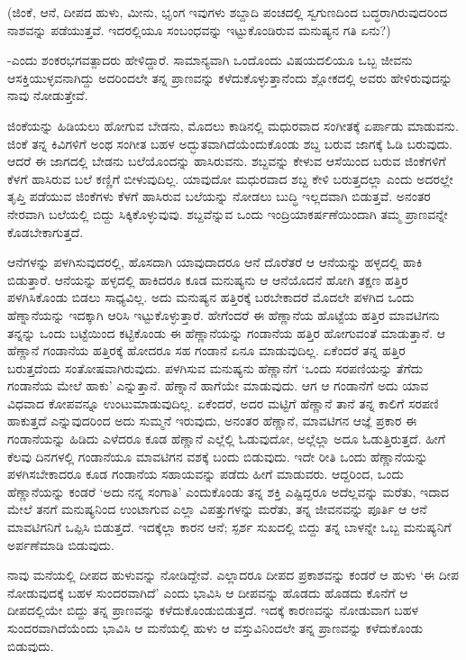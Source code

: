 (ಜಿಂಕೆ, ಆನೆ, ದೀಪದ ಹುಳು, ಮೀನು, ಭೃಂಗ ಇವುಗಳು ಶಬ್ದಾದಿ ಪಂಚದಲ್ಲಿ ಸ್ವಗುಣದಿಂದ ಬದ್ಧರಾಗಿರುವುದರಿಂದ ನಾಶವನ್ನು ಪಡೆಯುತ್ತವೆ. ಇದರಲ್ಲಿಯೂ ಸಂಬಂಧವನ್ನು ಇಟ್ಟುಕೊಂಡಿರುವ ಮನುಷ್ಯನ ಗತಿ ಏನು?)

-ಎಂದು ಶಂಕರಭಗವತ್ಪಾದರು ಹೇಳಿದ್ದಾರೆ. ಸಾಮಾನ್ಯವಾಗಿ ಒಂದೊಂದು ವಿಷಯದಲಿಯೂ ಒಬ್ಬ ಜೀವನು ಆಸಕ್ತಿಯುಳ್ಳವನಾಗಿದ್ದು ಅದರಿಂದಲೇ ತನ್ನ ಪ್ರಾಣವನ್ನು ಕಳೆದುಕೊಳ್ಳುತ್ತಾನೆಂದು ಶ್ಲೋಕದಲ್ಲಿ ಅವರು ಹೇಳಿರುವುದನ್ನು ನಾವು ನೋಡುತ್ತೇವೆ.

ಜಿಂಕೆಯನ್ನು ಹಿಡಿಯಲು ಹೋಗುವ ಬೇಡನು, ಮೊದಲು ಕಾಡಿನಲ್ಲಿ ಮಧುರವಾದ ಸಂಗೀತಕ್ಕೆ ಏರ್ಪಾಡು ಮಾಡುವನು. ಜಿಂಕೆ ತನ್ನ ಕಿವಿಗಳಿಗೆ ಅಂಥ ಸಂಗೀತ ಬಹಳ ಅದ್ಭುತವಾಗಿದೆಯೆಂದುಕೊಂಡು ಶಬ್ದ ಬರುವ ಜಾಗಕ್ಕೆ ಓಡಿ ಬರುವುದು. ಆದರೆ ಈ ಜಾಗದಲ್ಲಿ ಬೇಡನು ಬಲೆಯೊಂದನ್ನು ಹಾಸಿರುವನು. ಶಬ್ದವನ್ನು ಕೇಳುವ ಆಸೆಯಿಂದ ಬರುವ ಜಿಂಕೆಗಳಿಗೆ ಕೆಳಗೆ ಹಾಸಿರುವ ಬಲೆ ಕಣ್ಣಿಗೆ ಬೀಳುವುದಿಲ್ಲ. ಯಾವುದೋ ಮಧುರವಾದ ಶಬ್ದ ಕೇಳಿ ಬರುತ್ತದಲ್ಲಾ ಎಂದು ಅದರಲ್ಲೇ ತೃಪ್ತಿ ಪಡೆಯುವ ಜಿಂಕೆಗಳು ಕೆಳಗೆ ಹಾಸಿರುವ ಬಲೆಯನ್ನು ನೋಡಲು ಬುದ್ಧಿ ಇಲ್ಲದವಾಗಿ ಬಿಡುತ್ತವೆ. ಅನಂತರ ನೇರವಾಗಿ ಬಲೆಯಲ್ಲಿ ಬಿದ್ದು ಸಿಕ್ಕಿಕೊಳ್ಳುವುವು. ಶಬ್ದವೆನ್ನುವ ಒಂದು ಇಂದ್ರಿಯಾಕರ್ಷಣೆಯಿಂದಾಗಿ ತಮ್ಮ ಪ್ರಾಣವನ್ನೇ ಕೊಡಬೇಕಾಗುತ್ತದೆ.

ಆನೆಗಳನ್ನು ಪಳಗಿಸುವುದರಲ್ಲಿ, ಹೊಸದಾಗಿ ಯಾವುದಾದರೂ ಆನೆ ದೊರೆತರೆ ಆ ಆನೆಯನ್ನು ಹಳ್ಳದಲ್ಲಿ ಹಾಕಿ ಬಿಡುತ್ತಾರೆ. ಆನೆಯನ್ನು ಹಳ್ಳದಲ್ಲಿ ಹಾಕಿದರೂ ಕೂಡ ಮನುಷ್ಯನು ಆ ಆನೆಯೊದನೆ ಹೋಗಿ ತಕ್ಷಣ ಹತ್ತಿರ ಪಳಗಿಸಿಕೊಂಡು ಬಿಡಲು ಸಾಧ್ಯವಿಲ್ಲ. ಅದು ಮನುಷ್ಯನ ಹತ್ತಿರಕ್ಕೆ ಬರಬೇಕಾದರೆ ಮೊದಲೇ ಪಳಗಿದ ಒಂದು ಹೆಣ್ನಾನೆಯನ್ನು ಇದಕ್ಕಾಗಿ ಆರಿಸಿ ಇಟ್ಟುಕೊಳ್ಳುತ್ತಾರೆ. ಹೇಗೆಂದರೆ ಈ ಹೆಣ್ಣಾನೆಯ ಹೊಟ್ಟೆಯ ಹತ್ತಿರ ಮಾವಟಿಗನು ತನ್ನನ್ನು ಒಂದು ಬಟ್ಟೆಯಿಂದ ಕಟ್ಟಿಕೊಂಡು ಈ ಹೆಣ್ಣಾನೆಯನ್ನು ಗಂಡಾನೆಯ ಹತ್ತಿರ ಹೋಗುವಂತೆ ಮಾಡುತ್ತಾನೆ. ಆ ಹೆಣ್ಣಾನೆ ಗಂಡಾನೆಯ ಹತ್ತಿರಕ್ಕೆ ಹೋದರೂ ಸಹ ಗಂಡಾನೆ ಏನೂ ಮಾಡುವುದಿಲ್ಲ. ಏಕೆಂದರೆ ತನ್ನ ಹತ್ತಿರ ಬರುತ್ತದೆಂದು ಸಂತೋಷವಾಗಿರುವುದು. ಪಳಗಿಸುವ ಮನುಷ್ಯನು ಹೆಣ್ಣಾನೆಗೆ `ಒಂದು ಸರಪಣಿಯನ್ನು ತೆಗೆದು ಗಂಡಾನೆಯ ಮೇಲೆ ಹಾಕು' ಎನ್ನುತ್ತಾನೆ. ಹೆಣ್ನಾನೆ ಹಾಗೆಯೇ ಮಾಡುವುದು. ಆಗ ಆ ಗಂಡಾನೆಗೆ ಅದು ಯಾವ ವಿಧವಾದ ಕೋಪವನ್ನೂ ಉಂಟುಮಾಡುವುದಿಲ್ಲ. ಏಕೆಂದರೆ, ಅದರ ಮಟ್ಟಿಗೆ ಹೆಣ್ಣಾನೆ ತಾನೆ ತನ್ನ ಕಾಲಿಗೆ ಸರಪಣಿ ಹಾಕುತ್ತದೆ ಎನ್ನುವುದರಿಂದ ಅದು ಸುಮ್ಮನೆ ಇರುವುದು, ಅನಂತರ ಹೆಣ್ಣಾನೆ, ಮಾವಟಿಗನ ಆಜ್ಞೆ ಪ್ರಕಾರ ಈ ಗಂಡಾನೆಯನ್ನು ಹಿಡಿದು ಎಳೆದರೂ ಕೂಡ ಹೆಣ್ಣಾನೆ ಎಲ್ಲೆಲ್ಲಿ ಓಡುವುದೋ, ಅಲ್ಲೆಲ್ಲಾ ಅದೂ ಓಡುತ್ತಿರುತ್ತದೆ. ಹೀಗೆ ಕೆಲವು ದಿನಗಳಲ್ಲಿ ಗಂಡಾನೆಯೂ ಮಾವಟಿಗನ ವಶಕ್ಕೆ ಬಂದು ಬಿಡುವುದು. ಇದೇ ರೀತಿ ಒಂದು ಹೆಣ್ಣಾನೆಯನ್ನು ಪಳಗಿಸಬೇಕಾದರೂ ಕೂಡ ಗಂಡಾನೆಯ ಸಹಾಯವನ್ನು ಪಡೆದು ಹೀಗೆ ಮಾಡುವರು. ಆದ್ದರಿಂದ, ಒಂದು ಹೆಣ್ಣಾನೆಯನ್ನು ಕಂಡರೆ `ಅದು ನನ್ನ ಸಂಗಾತಿ' ಎಂದುಕೊಂಡು ತನ್ನ ಶಕ್ತಿ ಎಷ್ಟಿದ್ದರೂ ಅದೆಲ್ಲವನ್ನು ಮರೆತು, ಇದಾದ ಮೇಲೆ ತನಗೆ ಮನುಷ್ಯನಿಂದ ಉಂಟಾಗುವ ಎಲ್ಲಾ ವಿಪತ್ತುಗಳನ್ನು ಮರೆತು, ತನ್ನ ಜೀವನವನ್ನು ಪೂರ್ತಿ ಆ ಆನೆ ಮಾವಟಿಗನಿಗೆ ಒಪ್ಪಿಸಿ ಬಿಡುತ್ತದೆ. ಇದಕ್ಕೆಲ್ಲಾ ಕಾರನ ಆನೆ; ಸ್ಪರ್ಶ ಸುಖದಲ್ಲಿ ಬಿದ್ದು ತನ್ನ ಬಾಳನ್ನೇ ಒಬ್ಬ ಮನುಷ್ಯನಿಗೆ ಅರ್ಪಣೆಮಾಡಿ ಬಿಡುವುದು.

ನಾವು ಮನೆಯಲ್ಲಿ ದೀಪದ ಹುಳುವನ್ನು ನೋಡಿದ್ದೇವೆ. ಎಲ್ಲಾದರೂ ದೀಪದ ಪ್ರಕಾಶವನ್ನು ಕಂಡರೆ ಆ ಹುಳು `ಈ ದೀಪ ನೋಡುವುದಕ್ಕೆ ಬಹಳ ಸುಂದರವಾಗಿದೆ' ಎಂದು ಭಾವಿಸಿ ಆ ದೀಪವನ್ನು ಹೊಡದು ಹೊಡದು ಕೊನೆಗೆ ಆ ದೀಪದಲ್ಲಿಯೇ ಬಿದ್ದು ತನ್ನ ಪ್ರಾಣವನ್ನು ಕಳೆದುಕೊಂಡುಬಿಡುತ್ತದೆ. ಇದಕ್ಕೆ ಕಾರಣವನ್ನು ನೋಡುವಾಗ ಬಹಳ ಸುಂದರವಾಗಿದೆಯೆಂದು ಭಾವಿಸಿ ಆ ಮನೆಯಲ್ಲಿ ಹುಳು ಆ ವಸ್ತುವಿನಿಂದಲೇ ತನ್ನ ಪ್ರಾಣವನ್ನು ಕಳೆದುಕೊಂಡು ಬಿಡುವುದು.

